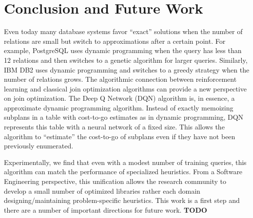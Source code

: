 \section{Conclusion and Future Work}
Even today many database systems favor ``exact'' solutions when the number of relations are small but switch to approximations after a certain point.
For example, PostgreSQL uses dynamic programming when the query has less than 12 relations and
then switches to a genetic algorithm for larger queries. 
Similarly, IBM DB2 uses dynamic programming and switches to a greedy strategy when the number of relations grows.
The algorithmic connection between reinforcement learning and classical join optimization algorithms can provide a new perspective on join optimization.
The Deep Q Network (DQN) algorithm is, in essence, a approximate dynamic programming algorithm.
Instead of exactly memoizing subplans in a table with cost-to-go estimates as in dynamic programming, DQN represents this table with a neural network of a fixed size.
This allows the algorithm to ``estimate'' the cost-to-go of subplans even if they have not been previously enumerated.

Experimentally, we find that even with a modest number of training queries, this algorithm can match the performance of specialized heuristics.
From a Software Engineering perspective, this unification allows the research community to develop a small number of optimized libraries  rather each domain designing/maintaining problem-specific heuristics.
This work is a first step and there are a number of important directions for future work.
\textbf{TODO}


